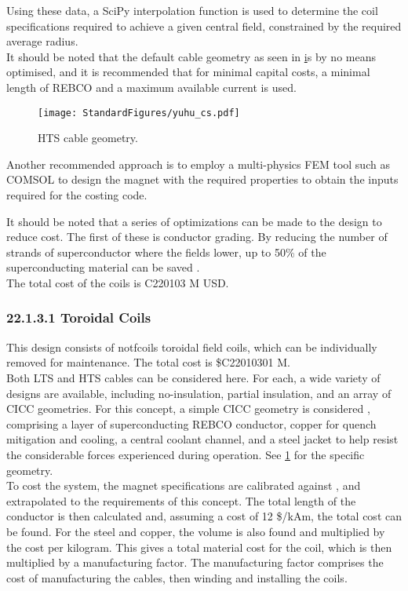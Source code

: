 Using these data, a SciPy interpolation function is used to determine the coil specifications required to achieve a given central field, constrained by the required average radius.\\

It should be noted that the default cable geometry as seen in \href{fig:yuhu_cs} is by no means optimised, and it is recommended that for minimal capital costs, a minimal length of REBCO and a maximum available current is used.


\begin{figure}[h]
    \centering
    \texttt{[image: StandardFigures/yuhu\_cs.pdf]}
    \caption{HTS cable geometry.}
    \label{fig:yuhu_cs}
\end{figure}

Another recommended approach is to employ a multi-physics FEM tool such as COMSOL to design the magnet with the required properties to obtain the inputs required for the costing code.

It should be noted that a series of optimizations can be made to the design to reduce cost. The first of these is conductor grading. By reducing the number of strands of superconductor where the fields lower, up to 50\% of the superconducting material can be saved \cite{uglietti2018progressing}.\\

The total cost of the coils is C220103 M USD.


\subsubsection*{22.1.3.1 Toroidal Coils}

This design consists of notfcoils toroidal field coils, which can be individually removed for maintenance. The total cost is \$C22010301 M.\\

Both LTS and HTS cables can be considered here. For each, a wide variety of designs are available, including no-insulation, partial insulation, and an array of CICC geometries. For this concept, a simple CICC geometry is considered \cite{Menard2016}, comprising a layer of superconducting REBCO conductor, copper for quench mitigation and cooling, a central coolant channel, and a steel jacket to help resist the considerable forces experienced during operation. See \ref{fig:yuhu_cs} for the specific geometry.\\

To cost the system, the magnet specifications are calibrated against \cite{Menard2016}, and extrapolated to the requirements of this concept. The total length of the conductor is then calculated and, assuming a cost of 12 \$/kAm, the total cost can be found. For the steel and copper, the volume is also found and multiplied by the cost per kilogram. This gives a total material cost for the coil, which is then multiplied by a manufacturing factor. The manufacturing factor comprises the cost of manufacturing the cables, then winding and installing the coils.

